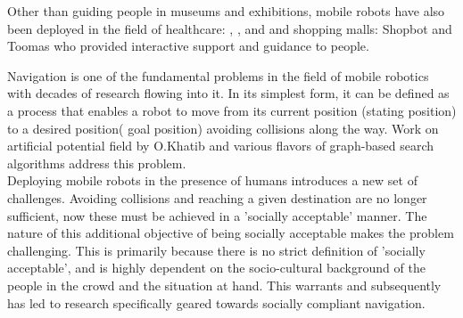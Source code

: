 Other than guiding people in museums and exhibitions, mobile robots have also been deployed in the field of healthcare: \cite{pearl_pollack_2002}, \cite{kim_socially_2016}, and \cite{kuderer_feature-based_nodate} and shopping malls: Shopbot \cite{shopbot_kanada} and Toomas \cite{toomas_gross_2009} who provided interactive support and guidance to people. 



Navigation is one of the fundamental problems in the field of mobile robotics with decades of research flowing into it. In its simplest form, it can be defined as a process that enables a robot to move from its current position (stating position) to a desired position( goal position) avoiding collisions along the way. Work on artificial potential field by O.Khatib \cite{khatib_1986} and various flavors of graph-based search algorithms address this problem. \\

Deploying mobile robots in the presence of humans introduces a new set of challenges. Avoiding collisions and reaching a given destination are no longer sufficient, now these must be achieved in a 'socially acceptable' manner. The  nature of this additional objective of being socially acceptable makes the problem  challenging. This is primarily because there is no strict definition of 'socially acceptable', and is highly dependent on the socio-cultural background of the people in the crowd and the situation at hand. This warrants and subsequently has led to research specifically geared towards socially compliant navigation.\\


